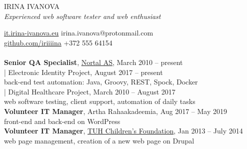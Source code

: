\documentclass[a4paper, 12pt]{article}
\begin{document}
\begin{center}
  {\LARGE{IRINA IVANOVA}}\\
  \textit{Experienced web software tester and web enthusiast}
\end{center}
\href{https://it.irina-ivanova.eu}{it.irina-ivanova.eu}
\hspace{4.6cm}
irina.ivanova@protonmail.com\\
\href{https://github.com/iriiiina}{github.com/iriiiina}
\hspace{4.4cm}
+372 555 64154\\

\\
\textbf{Senior QA Specialist}, \href{https://nortal.com}{Nortal AS}, March 2010 \--- present\\
\indent | Electronic Identity Project, August 2017 \--- present\\
\indent \indent \indent back-end test automation: Java, Groovy, REST, Spock, Docker\\
\indent | Digital Healthcare Project, March 2010 \--- August 2017\\
\indent \indent \indent web software testing, client support, automation of daily tasks\\
\textbf{Volunteer IT Manager}, Artha Rahaakadeemia, Aug 2017 \--- May 2019\\
\indent \indent \indent front-end and back-end on WordPress\\
\textbf{Volunteer IT Manager}, \href{https://www.lastefond.ee}{TUH Children's Foundation}, Jan 2013 \--- July 2014\\
\indent \indent \indent web page management, creation of a new web page on Drupal\\
\end{document}
